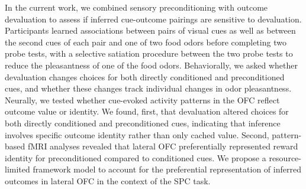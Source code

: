 \documentclass[12pt,letterpaper]{article}
\begin{document}
In the current work, we combined sensory preconditioning \citep{Brogden39} with outcome devaluation \citep{HowRey2020,liu2025distinct} to assess if inferred cue-outcome pairings are sensitive to devaluation. Participants learned associations between pairs of visual cues as well as between the second cues of each pair and one of two food odors before completing two probe tests, with a selective satiation procedure between the two probe tests to reduce the pleasantness of one of the food odors. Behaviorally, we asked whether devaluation changes choices for both directly conditioned and preconditioned cues, and whether these changes track individual changes in odor pleasantness. Neurally, we tested whether cue-evoked activity patterns in the OFC reflect outcome value or identity. We found, first, that devaluation altered choices for both directly conditioned and preconditioned cues, indicating that inference involves specific outcome identity rather than only cached value. Second, pattern-based fMRI analyses revealed that lateral OFC preferentially represented reward identity for preconditioned compared to conditioned cues. We propose a resource-limited framework model to account for the preferential representation of inferred outcomes in lateral OFC in the context of the SPC task.






\par\bigskip\begingroup
{}
\end{document}
